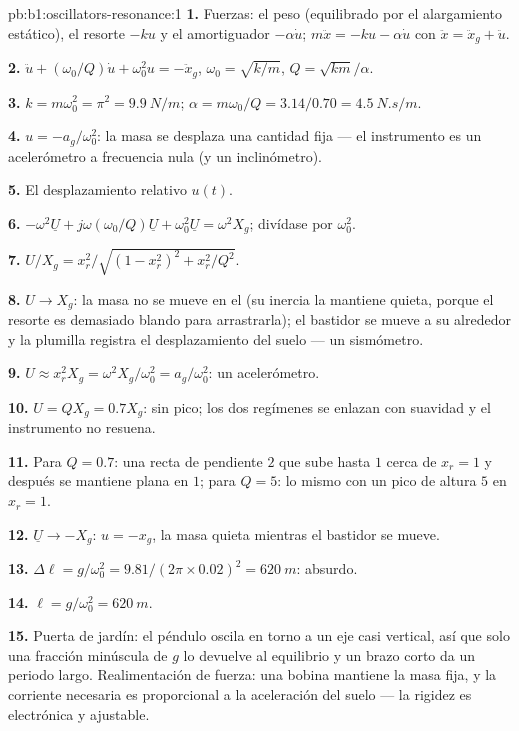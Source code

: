 \begin{solution}{pb:b1:oscillators-resonance:1}
\textbf{1.} Fuerzas: el peso (equilibrado por el alargamiento estático),
el resorte $-ku$ y el amortiguador $-\alpha\dot u$; $m\ddot x = -ku - \alpha\dot u$ con $\ddot x =
\ddot x_g + \ddot u$.

\textbf{2.} $\ddot u + (\omega_0/Q)\dot u + \omega_0^2u = -\ddot x_g$, $\omega_0 =
\sqrt{k/m}$, $Q = \sqrt{km}/\alpha$.

\textbf{3.} $k = m\omega_0^2 = \pi^2 = \qty{9.9}{N/m}$; $\alpha = m\omega_0/Q =
3.14/0.70 = \qty{4.5}{N.s/m}$.

\textbf{4.} $u = -a_g/\omega_0^2$: la masa se desplaza una cantidad fija ---
el instrumento es un acelerómetro a frecuencia nula (y un inclinómetro).

\textbf{5.} El desplazamiento relativo $u(t)$.

\textbf{6.} $-\omega^2\underline U + j\omega(\omega_0/Q)\underline U + \omega_0^2\underline U
= \omega^2X_g$; divídase por $\omega_0^2$.

\textbf{7.} $U/X_g = x_r^2/\sqrt{(1 - x_r^2)^2 + x_r^2/Q^2}$.

\textbf{8.} $U \to X_g$: la masa no se mueve en el  (su
inercia la mantiene quieta, porque el resorte es demasiado blando para
arrastrarla); el bastidor se mueve a su alrededor y la plumilla registra
el desplazamiento del suelo --- un sismómetro.

\textbf{9.} $U \approx x_r^2X_g = \omega^2X_g/\omega_0^2 = a_g/\omega_0^2$: un
acelerómetro.

\textbf{10.} $U = QX_g = 0.7X_g$: sin pico; los dos regímenes se enlazan
con suavidad y el instrumento no resuena.

\textbf{11.} Para $Q = 0.7$: una recta de pendiente $2$ que sube hasta $1$
cerca de $x_r = 1$ y después se mantiene plana en $1$; para $Q = 5$: lo
mismo con un pico de altura $5$ en $x_r = 1$.

\textbf{12.} $\underline U \to -X_g$: $u = -x_g$, la masa quieta mientras
el bastidor se mueve.

\textbf{13.} $\Delta\ell = g/\omega_0^2 = 9.81/(2\pi \times 0.02)^2 = \qty{620}{m}$:
absurdo.

\textbf{14.} $\ell = g/\omega_0^2 = \qty{620}{m}$.

\textbf{15.} Puerta de jardín: el péndulo oscila en torno a un eje casi
vertical, así que solo una fracción minúscula de $g$ lo devuelve al
equilibrio y un brazo corto da un periodo largo. Realimentación de fuerza:
una bobina mantiene la masa fija, y la corriente necesaria es proporcional
a la aceleración del suelo --- la rigidez es electrónica y ajustable.


\end{solution}
